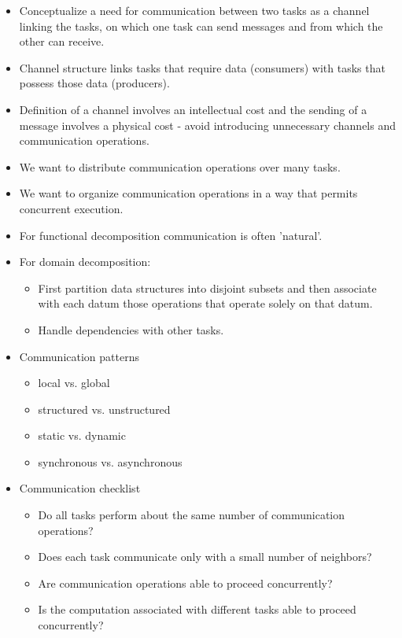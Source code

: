 \documentclass[paper=a4, fontsize=11pt]{scrartcl} %
\numberwithin{equation}{section} %
\numberwithin{figure}{section} %
\numberwithin{table}{section} %
\begin{document}
\begin{itemize}
\begin{itemize}
    \begin{itemize}
      \item Conceptualize a need for communication between two tasks as a channel linking the tasks, on which one task can send messages and from which the other can receive.
      \item Channel structure links tasks that require data (consumers) with tasks that possess those data (producers).
      \item Definition of a channel involves an intellectual cost and the sending of a message involves a physical cost - avoid introducing unnecessary channels and communication operations.
      \item We want to distribute communication operations over many tasks.
      \item We want to organize communication operations in a way that permits concurrent execution.
      \item For functional decomposition communication is often 'natural'.
      \item For domain decomposition:
      \begin{itemize}
        \item First partition data structures into disjoint subsets and then associate with each datum those operations that operate solely on that datum.
        \item Handle dependencies with other tasks.
      \end{itemize}
      \item Communication patterns
      \begin{itemize}
        \item local vs. global
        \item structured vs. unstructured
        \item static vs. dynamic
        \item synchronous vs. asynchronous
      \end{itemize}
      \item Communication checklist
      \begin{itemize}
        \item Do all tasks perform about the same number of communication operations?
        \item Does each task communicate only with a small number of neighbors?
        \item Are communication operations able to proceed concurrently?
        \item Is the computation associated with different tasks able to proceed concurrently?

\end{itemize}
\end{itemize}
\end{itemize}
\end{itemize}
\end{document}
